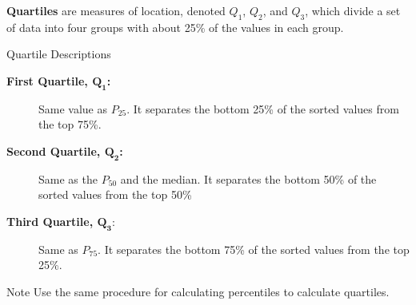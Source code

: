 \documentclass{beamer}
\begin{document}
\begin{frame}
\begin{definition}
\textbf{Quartiles} are measures of location, denoted $Q_1$, $Q_2$, and $Q_3$, which divide a set of data into four groups with about 25\% of the values in each group.
\end{definition}\pause

\begin{block}{Quartile Descriptions}
\begin{description}
\item[\textbf{First Quartile, $\boldsymbol{Q_1}$:}] Same value as $P_{25}$. It separates the bottom 25\% of the sorted values from the top 75\%.\pause
\item[\textbf{Second Quartile, $\boldsymbol{Q_2}$:}] Same as the $P_{50}$ and the median. It separates the bottom 50\% of the sorted values from the top 50\%\pause
\item[\textbf{Third Quartile, $\boldsymbol{Q_3}$}:] Same as $P_{75}$. It separates the bottom 75\% of the sorted values from the top 25\%.
\end{description}
\end{block}\pause

\begin{block}{Note}
Use the same procedure for calculating percentiles to calculate quartiles.
\end{block}
\end{frame}
\end{document}
